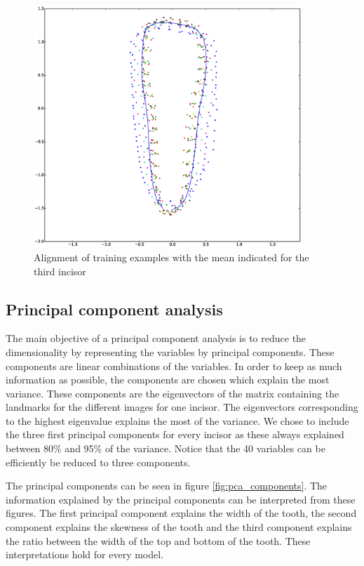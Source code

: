 \documentclass[a4paper,10pt]{article}
\begin{document}
\begin{figure}[htbp]
	\centering
	\includegraphics[width=0.9\textwidth, trim=0cm 2.5cm 0cm 3cm, clip]{procrustes_single_tooth}
	\caption{Alignment of training examples with the mean indicated for the third incisor}
	\label{fig:procrustes_single_tooth}
\end{figure}

\subsection{Principal component analysis}
The main objective of a principal component analysis is to reduce the dimensionality by representing the variables by principal components. These components are linear combinations of the variables. In order to keep as much information as possible, the components are chosen which explain the most variance. These components are the eigenvectors of the matrix containing the landmarks for the different images for one incisor. The eigenvectors corresponding to the highest eigenvalue explains the most of the variance. We chose to include the three first principal components for every incisor as these always explained between 80\% and 95\% of the variance. Notice that the 40 variables can be efficiently be reduced to three components.

The principal components can be seen in figure \ref{fig:pca_components}. The information explained by the principal components can be interpreted from these figures. The first principal component explains the width of the tooth, the second component explains the skewness of the tooth and the third component explains the ratio between the width of the top and bottom of the tooth. These interpretations hold for every model.
\end{document}
